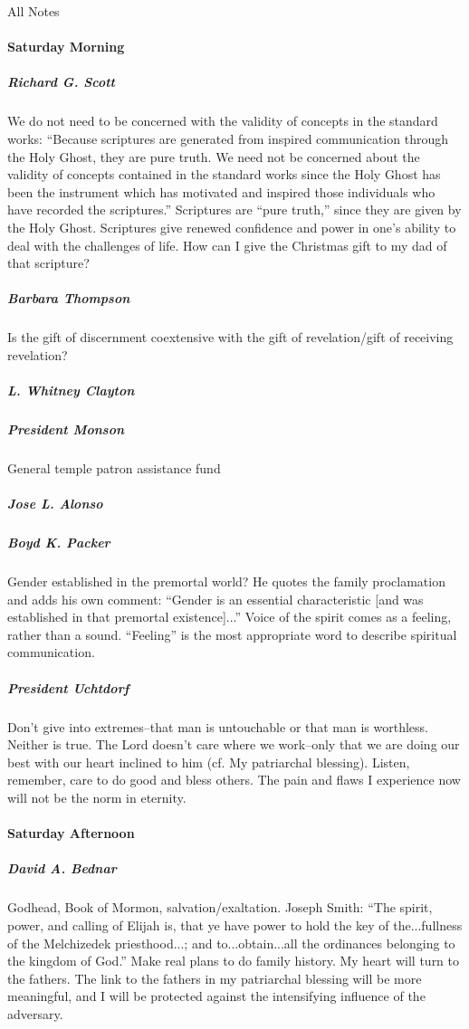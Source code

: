 All Notes

\paragraph*{Saturday Morning}

\subparagraph*{Richard G. Scott} We do not need to be concerned with the validity of concepts in the standard works: ``Because scriptures are generated from inspired communication through the Holy Ghost, they are pure truth. We need not be concerned about the validity of concepts contained in the standard works since the Holy Ghost has been the instrument which has motivated and inspired those individuals who have recorded the scriptures.'' Scriptures are ``pure truth,'' since they are given by the Holy Ghost. Scriptures give renewed confidence and power in one's ability to deal with the challenges of life. How can I give the Christmas gift to my dad of that scripture?

\subparagraph*{Barbara Thompson} Is the gift of discernment coextensive with the gift of revelation/gift of receiving revelation?

\subparagraph*{L. Whitney Clayton}

\subparagraph*{President Monson} General temple patron assistance fund

\subparagraph*{Jose L. Alonso}

\subparagraph*{Boyd K. Packer} Gender established in the premortal world? He quotes the family proclamation and adds his own comment: ``Gender is an essential characteristic [and was established in that premortal existence]...'' Voice of the spirit comes as a feeling, rather than a sound. ``Feeling'' is the most appropriate word to describe spiritual communication.

\subparagraph*{President Uchtdorf} Don't give into extremes--that man is untouchable or that man is worthless. Neither is true. The Lord doesn't care where we work--only that we are doing our best with our heart inclined to him (cf. My patriarchal blessing). Listen, remember, care to do good and bless others. The pain and flaws I experience now will not be the norm in eternity.

\paragraph*{Saturday Afternoon}

\subparagraph*{David A. Bednar} Godhead, Book of Mormon, salvation/exaltation. Joseph Smith: ``The spirit, power, and calling of Elijah is, that ye have power to hold the key of the...fullness of the Melchizedek priesthood...; and to...obtain...all the ordinances belonging to the kingdom of God.'' Make real plans to do family history. My heart will turn to the fathers. The link to the fathers in my patriarchal blessing will be more meaningful, and I will be protected against the intensifying influence of the adversary.

